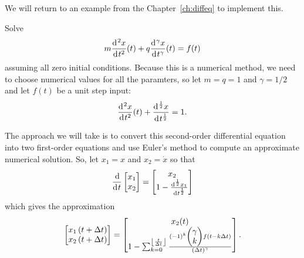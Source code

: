 We will return to an example from the Chapter~\ref{ch:diffeq} to implement this.

\begin{example}
  Solve
  \begin{equation*}
    m \frac{\operatorname{d}\hspace*{-1pt}^2 x}{\operatorname{d}\hspace*{-1pt} t^2}(t) + q \frac{\operatorname{d}\hspace*{-1pt}^\gamma x}{\operatorname{d}\hspace*{-1pt} t^\gamma}(t) = f(t)
  \end{equation*}
  assuming all zero initial conditions. Because this is a numerical method, we need to choose numerical values for all the paramters, so let $m=q=1$ and $\gamma = 1/2$ and let $f(t)$ be a unit step input:
  \begin{equation*}
    \frac{\operatorname{d}\hspace*{-1pt}^2 x}{\operatorname{d}\hspace*{-1pt} t^2}(t) + \frac{\operatorname{d}\hspace*{-1pt}^\frac{1}{2} x}{\operatorname{d}\hspace*{-1pt} t^\frac{1}{2}} = 1.
  \end{equation*}

  The approach we will take is to convert this second-order differential equation into two first-order equations and use Euler's method to compute an approximate numerical solution. So, let $x_1 = x$ and $x_2 = \dot x$ so that
  \begin{equation*}
    \frac{\operatorname{d}\hspace*{-1pt}}{\operatorname{d}\hspace*{-1pt} t}\begin{bmatrix}
    x_1 \\ x_2
    \end{bmatrix} = 
    \begin{bmatrix}
      x_2 \\
    1 - \frac{\operatorname{d}\hspace*{-1pt}^\frac{1}{2} x_1}{\operatorname{d}\hspace*{-1pt} t^\frac{1}{2}}
    \end{bmatrix}
  \end{equation*}
  which gives the approximation
  \begin{equation*}
    \begin{bmatrix}
      x_1\left(t + \Delta t \right) \\
      x_2\left(t + \Delta t \right)
    \end{bmatrix} =
    \begin{bmatrix}
      x_2(t) \\
      1 - \sum_{k=0}^{\left\lfloor \frac{t}{\Delta t} \right\rfloor} \frac{(-1)^k  \begin{pmatrix} \gamma \\ k
      \end{pmatrix} f \left( t - k \Delta t \right)}{\left( \Delta t \right)^\gamma}
    \end{bmatrix}.
  \end{equation*}
\end{example}
